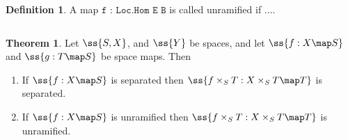 \documentclass{book}
\theoremstyle{definition}
\newtheorem{definition}{Definition}
\newtheorem{theorem}{Theorem}
\newcounter{lcounter}
\begin{document}
\begin{center}
\begin{tcolorbox}[width=5in,colback={white},title={\begin{center}\texttt{Lean \thelcounter} \addtocounter{lcounter}{1}  \end{center}},colbacktitle=Blue,coltitle=black]
\begin{verbatim}

\end{verbatim}
\end{tcolorbox}
\end{center}

\begin{definition}
A map $\texttt{f : Loc.Hom E B}$ is called unramified if ....
\end{definition}

\begin{center}
\begin{tcolorbox}[width=5in,colback={white},title={\begin{center}\texttt{Lean \thelcounter} \addtocounter{lcounter}{1}  \end{center}},colbacktitle=Blue,coltitle=black]
\begin{verbatim}

\end{verbatim}
\end{tcolorbox}
\end{center}

\begin{theorem}
Let $\ss{S, X}$, and $\ss{Y}$ be spaces, and let $\ss{f : X \map S}$ and $\ss{g : T \map S}$ be space maps. Then
\begin{enumerate}
\item If $\ss{f : X \map S}$ is separated then $\ss{f \times_S T : X \times_S T \map T}$ is separated.
\item If $\ss{f : X \map S}$ is unramified then $\ss{f \times_S T : X \times_S T \map T}$ is unramified.
\end{enumerate}
\end{theorem}
\end{document}
